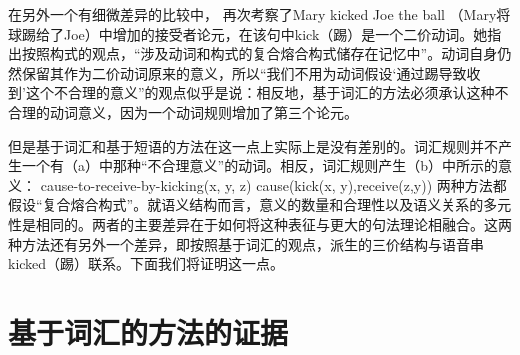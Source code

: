     在另外一个有细微差异的比较中， \citet[--140]{Goldberg95a}再次考察了Mary kicked Joe the ball （Mary将球踢给了Joe）中增加的接受者论元，在该句中kick（踢）是一个二价动词。她指出按照构式的观点，“涉及动词和构式的复合熔合构式储存在记忆中”。动词自身仍然保留其作为二价动词原来的意义，所以“我们不用为动词假设‘通过踢导致收到’这个不合理的意义”的观点似乎是说：相反地，基于词汇的方法必须承认这种不合理的动词意义，因为一个动词规则增加了第三个论元。

    但是基于词汇和基于短语的方法在这一点上实际上是没有差别的。词汇规则并不产生一个有（a）中那种“不合理意义”的动词。相反，词汇规则产生（b）中所示的意义：
\eal
\ex cause-to-receive-by-kicking(x, y, z) 
\ex cause(kick(x, y),receive(z,y))
\zl
两种方法都假设“复合熔合构式”。就语义结构而言，意义的数量和合理性以及语义关系的多元性是相同的。两者的主要差异在于如何将这种表征与更大的句法理论相融合。这两种方法还有另外一个差异，即按照基于词汇的观点，派生的三价结构与语音串kicked（踢）联系。下面我们将证明这一点。
 
\section{基于词汇的方法的证据}
